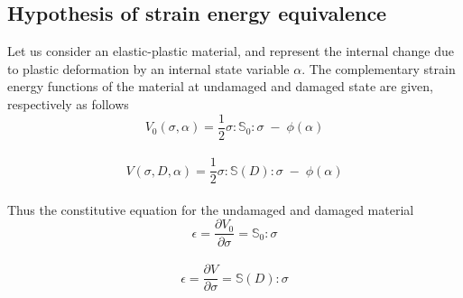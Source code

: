 \documentclass[a4paper,12pt]{article}
\begin{document}
\subsection{Hypothesis of strain energy equivalence}\label{Hypothesis of strain energy equivalence}
\indent\indent\indent Let us consider an elastic-plastic material, and represent the internal change due to plastic deformation by an internal state variable $\alpha$. The complementary strain energy functions of the material at undamaged and damaged state are given, respectively as follows
\\
\begin{equation}
V_{0}(\sigma,\alpha) = \frac{1}{2}\sigma : \mathbb{S}_{0} : \sigma \; - \; \phi(\alpha)
\end{equation}
\\
\begin{equation}
V(\sigma,D,\alpha) = \frac{1}{2}\sigma : \mathbb{S}(D) : \sigma \; - \; \phi(\alpha)
\end{equation}
\\
Thus the constitutive equation for the undamaged and damaged material 
\\
\begin{equation}
\epsilon = \frac{\partial V_{0} }{\partial \sigma} = \mathbb{S}_{0} : \sigma
\end{equation}
\\
\begin{equation}
\epsilon = \frac{\partial V }{\partial \sigma} = \mathbb{S}(D) : \sigma
\label{eqn:Strain_energy_eq}
\end{equation}
\end{document}
